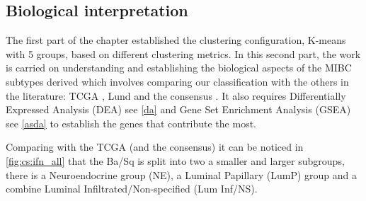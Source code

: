\subsection{Biological interpretation} \label{s:cs:bio_interp}

The first part of the chapter established the clustering configuration, K-means with 5 groups, based on different clustering metrics. In this second part, the work is carried on understanding and establishing the biological aspects of the MIBC subtypes derived which involves comparing our classification with the others in the literature: TCGA \cite{Robertson2017-mg}, Lund \citet{Marzouka2018-ge} and the consensus \citet{Kamoun2020-tj}. It also requires Differentially Expressed Analysis (DEA) see \cref{da} and Gene Set Enrichment Analysis (GSEA) see \cref{asda} to establish the genes that contribute the most.


Comparing with the TCGA \citet{Robertson2017-mg} (and the consensus) it can be noticed in \cref{fig:cs:ifn_all} that the Ba/Sq is split into two a smaller and larger subgroups, there is a Neuroendocrine group (NE), a Luminal Papillary (LumP) group and a combine Luminal Infiltrated/Non-specified (Lum Inf/NS). 


